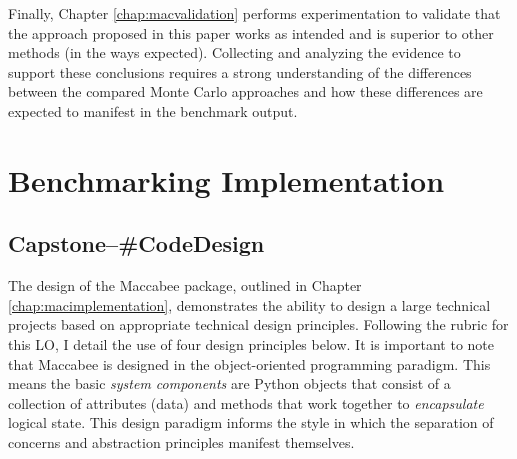 \documentclass[../main.tex]{subfiles}
\begin{document}
Finally, Chapter \ref{chap:macvalidation} performs experimentation to validate that the approach proposed in this paper works as intended and is superior to other methods (in the ways expected). Collecting and analyzing the evidence to support these conclusions requires a strong understanding of the differences between the compared Monte Carlo approaches and how these differences are expected to manifest in the benchmark output.


\section{Benchmarking Implementation}

\subsection*{\textbf{Capstone--\#CodeDesign}}
\label{lo:CodeDesign}

The design of the Maccabee package, outlined in Chapter \ref{chap:macimplementation}, demonstrates the ability to design a large technical projects based on appropriate technical design principles. Following the rubric for this LO, I detail the use of four design principles below. It is important to note that Maccabee is designed in the object-oriented programming paradigm. This means the basic \textit{system components} are Python objects that consist of a collection of attributes (data) and methods that work together to \textit{encapsulate} logical state. This design paradigm informs the style in which the separation of concerns and abstraction principles manifest themselves.
\end{document}
